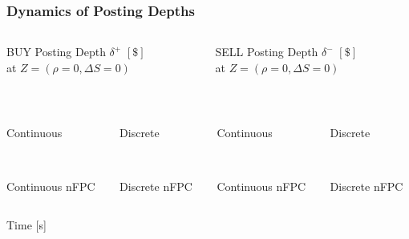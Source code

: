 \begin{frame}
\frametitle{Dynamics of Posting Depths}
\begin{columns}[T] %
\begin{column}{.48\textwidth}
BUY Posting Depth $\delta^+$ $[\$]$\\
at $Z=(\rho = 0, \Delta S = 0)$
\end{column}%
\hfill%
\begin{column}{.48\textwidth}
SELL Posting Depth $\delta^-$ $[\$]$\\
at $Z=(\rho = 0, \Delta S = 0)$
\end{column}%
\end{columns}
\vspace{\baselineskip}
\begin{columns}[T] %
\begin{column}{.24\textwidth}
\centering%
\\
{\scriptsize Continuous \par}
\\
{\scriptsize Continuous nFPC \par}
\end{column}%
\begin{column}{.24\textwidth}
\centering%
\\
{\scriptsize Discrete \par}
\\
{\scriptsize Discrete nFPC \par}
\end{column}%
\hfill%
\vrule{}
\hfill%
\begin{column}{.24\textwidth}
\centering%
\\
{\scriptsize Continuous \par}
\\
{\scriptsize Continuous nFPC \par}
\end{column}%
\begin{column}{.24\textwidth}
\centering%
\\
{\scriptsize Discrete \par}
\\
{\scriptsize Discrete nFPC \par}
\end{column}%
\end{columns}
\centering
{\vspace{0.5\baselineskip} \scriptsize Time [s] \par}
\vspace{0.5\baselineskip}
\end{frame}

